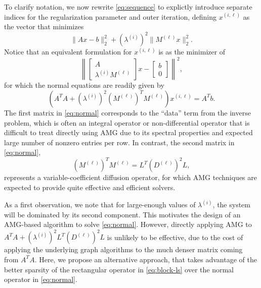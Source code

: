 To clarify notation, we now rewrite \eqref{eq:sequence} to explictly
introduce separate indices for the regularization parameter and outer
iteration, defining $x^{(i,\ell)}$ as the vector that minimizes
\[
\| A x - b \|_2^2 + \left(\lambda^{(i)}\right)^2 \| M^{(\ell)} x \|_2^2.
\]
Notice that an equivalent formulation for $x^{(i,\ell)}$ is as the
minimizer of
\begin{equation}
\label{eq:block-ls}
\left\| \left[\begin{array}{c} A \\ \lambda^{(i)}
                           M^{(\ell)}\end{array}\right]x - \left[\begin{array}{c} b \\ 0 \end{array}\right]\right\|^2,
\end{equation}
for which the normal equations are readily given by
\begin{equation}
\label{eq:normal}
\left(A^TA + \left(\lambda^{(i)}\right)^2 \left(M^{(\ell)}\right)^TM^{(\ell)}\right)x^{(i,\ell)} = A^Tb.
\end{equation}
The first matrix in \eqref{eq:normal} corresponds to the ``data'' term
from the inverse problem, which is often an integral operator or
non-differential operator that is difficult to treat directly using
AMG due to its spectral properties and expected large number of
nonzero entries per row.  In contrast, the second matrix
in \eqref{eq:normal},
\[
\left(M^{(\ell)}\right)^TM^{(\ell)} = L^T\left(D^{(\ell)}\right)^2L,
\]
represents a variable-coefficient diffusion operator, for which AMG
techniques are expected to provide quite effective and efficient
solvers.

As a first observation, we note that for large-enough values of
$\lambda^{(i)}$, the system will be dominated by its second
component.  This motivates the design of an AMG-based algorithm to
solve \eqref{eq:normal}.  However, directly applying
AMG to $A^TA + \left(\lambda^{(i)}\right)^2
L^T\left(D^{(\ell)}\right)^2L$ is unlikely to be effective, due to the cost of applying the underlying graph
algorithms to the much denser matrix coming from $A^TA$.  Here, we
propose an alternative approach, that takes advantage of the
better sparsity of the rectangular operator in \eqref{eq:block-ls}
over the normal operator in \eqref{eq:normal}.


